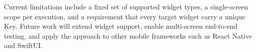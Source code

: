 \documentclass[conference]{IEEEtran}
\renewcommand{\texttt}[1]{\textnormal{#1}}
\begin{document}
Current limitations include a fixed set of supported widget types, a
single-screen scope per execution, and a requirement that every target
widget carry a unique \texttt{Key}. Future work will extend widget
support, enable multi-screen end-to-end testing, and apply the approach
to other mobile frameworks such as React Native and SwiftUI.



\end{document}
